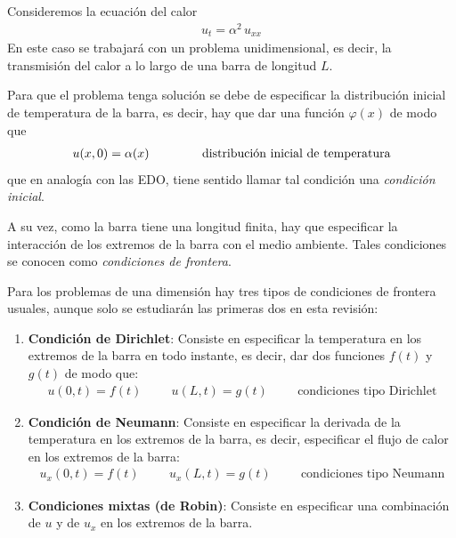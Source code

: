 Consideremos la ecuación del calor
\begin{align*}
u_{t} =  \alpha^{2} \,  u_{xx}
\end{align*}
En este caso se trabajará con un problema unidimensional, es decir, la transmisión del calor a lo largo de una barra de longitud $L$.
\par
Para que el problema tenga solución se debe de especificar la distribución inicial de temperatura de la barra, es decir, hay que dar una función $\varphi (x)$ de modo que
\begin{align}
u (x, 0) = \alpha (x) \hspace{1.5cm} \text{distribución inicial de temperatura}
\label{eq:ecuacion_06_02_02}
\end{align}
que en analogía con las EDO, tiene sentido llamar tal condición una \emph{condición inicial}.
\par
A su vez, como la barra tiene una longitud finita, hay que especificar la interacción de los extremos de la barra con el medio ambiente. Tales condiciones se conocen como \emph{condiciones de frontera}.
\par
Para los problemas de una dimensión hay tres tipos de condiciones de frontera usuales, aunque solo se estudiarán las primeras dos en esta revisión:
\begin{enumerate}
\item \textbf{Condición de Dirichlet}: Consiste en especificar la temperatura en los extremos de la barra en todo instante, es decir, dar dos funciones $f (t)$ y $g (t)$ de modo que:
\begin{align}
u (0, t) = f (t)  \hspace{1cm} u (L, t) = g (t) \hspace{1cm} \text{condiciones tipo Dirichlet}
\label{eq:ecuacion_06_02_03}    
\end{align}
\item \textbf{Condición de Neumann}: Consiste en especificar la derivada de la temperatura en los extremos de la barra, es decir, especificar el flujo de calor en los extremos de la barra:
\begin{align}
u_{x} (0, t) = f (t) \hspace{1cm} u_{x} (L, t) = g (t) \hspace{1cm} \text{condiciones tipo Neumann}
\label{eq:ecuacion_06_02_04}    
\end{align}
\item \textbf{Condiciones mixtas (de Robin)}: Consiste en especificar una combinación de $u$ y de $u_{x}$ en los extremos de la barra.
\end{enumerate}

